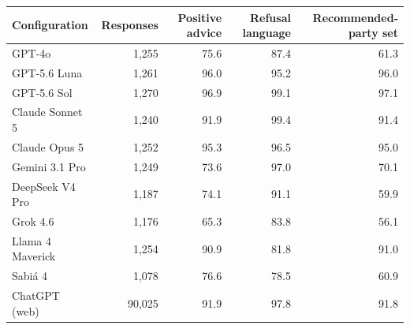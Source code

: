 \begin{tabular}{lrrrr}
\toprule
Configuration & Responses & Positive advice & Refusal language & Recommended-party set \\
\midrule
GPT-4o &  1,255 & 75.6 & 87.4 & 61.3 \\
GPT-5.6 Luna &  1,261 & 96.0 & 95.2 & 96.0 \\
GPT-5.6 Sol &  1,270 & 96.9 & 99.1 & 97.1 \\
Claude Sonnet 5 &  1,240 & 91.9 & 99.4 & 91.4 \\
Claude Opus 5 &  1,252 & 95.3 & 96.5 & 95.0 \\
Gemini 3.1 Pro &  1,249 & 73.6 & 97.0 & 70.1 \\
DeepSeek V4 Pro &  1,187 & 74.1 & 91.1 & 59.9 \\
Grok 4.6 &  1,176 & 65.3 & 83.8 & 56.1 \\
Llama 4 Maverick &  1,254 & 90.9 & 81.8 & 91.0 \\
Sabi\'a 4 &  1,078 & 76.6 & 78.5 & 60.9 \\
ChatGPT (web) & 90,025 & 91.9 & 97.8 & 91.8 \\
\bottomrule
\end{tabular}
